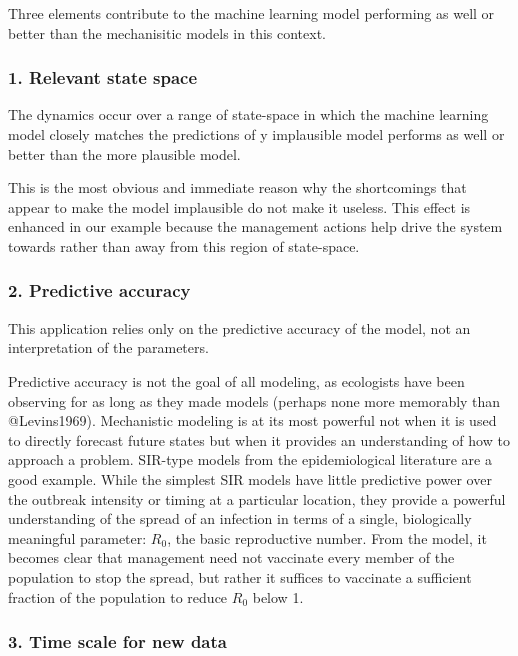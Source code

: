\documentclass[author-year, review]{elsarticle} %
\begin{document}
Three elements contribute to the machine learning model performing as
well or better than the mechanisitic models in this context.

\subsubsection{1. Relevant state space}

The dynamics occur over a range of state-space in which the machine
learning model closely matches the predictions of y implausible model
performs as well or better than the more plausible model.

This is the most obvious and immediate reason why the shortcomings that
appear to make the model implausible do not make it useless. This effect
is enhanced in our example because the management actions help drive the
system towards rather than away from this region of state-space.

\subsubsection{2. Predictive accuracy}

This application relies only on the predictive accuracy of the model,
not an interpretation of the parameters.

Predictive accuracy is not the goal of all modeling, as ecologists have
been observing for as long as they made models (perhaps none more
memorably than @Levins1969). Mechanistic modeling is at its most
powerful not when it is used to directly forecast future states but when
it provides an understanding of how to approach a problem. SIR-type
models from the epidemiological literature are a good example. While the
simplest SIR models have little predictive power over the outbreak
intensity or timing at a particular location, they provide a powerful
understanding of the spread of an infection in terms of a single,
biologically meaningful parameter: $R_0$, the basic reproductive number.
From the model, it becomes clear that management need not vaccinate
every member of the population to stop the spread, but rather it
suffices to vaccinate a sufficient fraction of the population to reduce
$R_0$ below 1.

\subsubsection{3. Time scale for new data}
\end{document}

